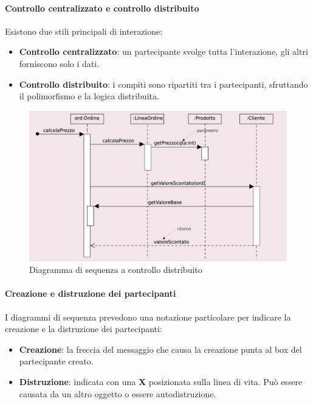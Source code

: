 \paragraph{Controllo centralizzato e controllo distribuito}
Esistono due stili principali di interazione:
\begin{itemize}
    \item \textbf{Controllo centralizzato}: un partecipante svolge tutta l’interazione, gli altri forniscono solo i dati.
    \item \textbf{Controllo distribuito}: i compiti sono ripartiti tra i partecipanti, sfruttando il polimorfismo e la logica distribuita.
\end{itemize}

\begin{figure}[H]
    \centering
    \includegraphics[width=0.75\linewidth]{assets/UML/sequence/sequence-2.png}
    \caption{Diagramma di sequenza a controllo distribuito}
\end{figure}

\paragraph{Creazione e distruzione dei partecipanti}
I diagrammi di sequenza prevedono una notazione particolare per indicare la creazione e la distruzione dei partecipanti:
\begin{itemize}
    \item \textbf{Creazione}: la freccia del messaggio che causa la creazione punta al box del partecipante creato.
    \item \textbf{Distruzione}: indicata con una \textbf{X} posizionata sulla linea di vita. Può essere causata da un altro oggetto o essere autodistruzione.
\end{itemize}

